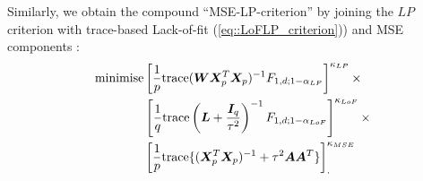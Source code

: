 Similarly, we obtain the compound ``MSE-LP-criterion'' by joining the $LP$ criterion with trace-based Lack-of-fit (\ref{eq::LoFLP_criterion})) and MSE components :
\begin{align}
\label{eq::MSE_L}
\mbox{minimise} &\left[\frac{1}{p}\mbox{trace}(\bm{WX}^T_{p}\bm{X}_{p})^{-1}F_{1,d;1-\alpha_{LP}}\right]^{\kappa_{LP}}\times \notag\\& \left[\frac{1}{q}\mbox{trace}\left(\bm{L}+\frac{\bm{I}_{q}}{\tau^{2}}\right)^{-1}F_{1,d;1-\alpha_{LoF}}\right]^{\kappa_{LoF}}\times 
\notag\\& \left[\frac{1}{p}\mbox{trace}\{(\bm{X}^T_{p}\bm{X}_{p})^{-1}+\tau^2\bm{A}\bm{A}^T\}\right]^{\kappa_{MSE}}_{.}
\end{align}
